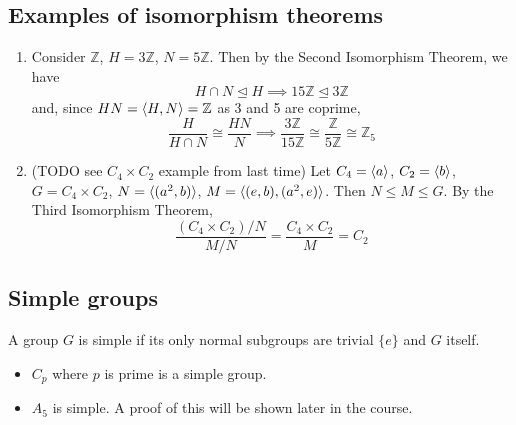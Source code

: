 \subsection{Examples of isomorphism theorems}
\begin{enumerate}
	\item Consider \(\mathbb Z\), \(H = 3 \mathbb Z\), \(N = 5 \mathbb Z\).
	      Then by the Second Isomorphism Theorem, we have
	      \[
		      H \cap N \trianglelefteq H \implies 15\mathbb Z \trianglelefteq 3\mathbb Z
	      \]
	      and, since \(HN = \langle{} H, N \rangle = \mathbb Z\) as 3 and 5 are coprime,
	      \[
		      \frac{H}{H \cap N} \cong \frac{HN}{N} \implies \frac{3\mathbb Z}{15\mathbb Z} \cong \frac{\mathbb Z}{5\mathbb Z} \cong \mathbb Z_5
	      \]
	\item (TODO see \(C_4 \times C_2\) example from last time) Let \(C_4 = \langle{} a \rangle\), \(C_2 = \langle{} b \rangle\), \(G = C_4 \times C_2\), \(N = \langle{} (a^2, b) \rangle\), \(M = \langle{} (e, b), (a^2, e) \rangle\).
	      Then \(N \leq M \leq G\).
	      By the Third Isomorphism Theorem,
	      \[
		      \frac{(C_4 \times C_2) / N}{M / N} = \frac{C_4 \times C_2}{M} = C_2
	      \]
\end{enumerate}

\subsection{Simple groups}
\begin{definition}
	A group \(G\) is simple if its only normal subgroups are trivial \(\{ e \}\) and \(G\) itself.
\end{definition}
\begin{itemize}
	\item \(C_p\) where \(p\) is prime is a simple group.
	\item \(A_5\) is simple.
	      A proof of this will be shown later in the course.
\end{itemize}

